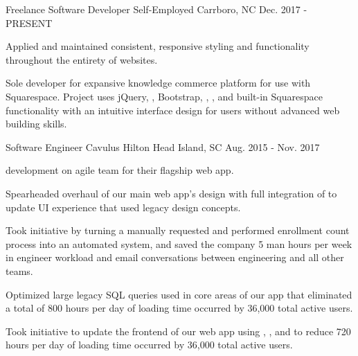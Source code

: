 

\begin{cventries}

  \cventry
    {Freelance Software Developer} %
    {Self-Employed} %
    {Carrboro, NC} %
    {Dec. 2017 - PRESENT} %
    {
      \begin{cvitems} %
        \item {Applied and maintained consistent, responsive  styling and functionality throughout the entirety of  websites.}
        \item {Sole developer for expansive knowledge commerce platform for use with Squarespace. Project uses jQuery, , Bootstrap, , , and built-in Squarespace functionality with an intuitive interface design for users without advanced web building skills.}
      \end{cvitems}
    }

  \cventry
    {Software Engineer} %
    {Cavulus} %
    {Hilton Head Island, SC} %
    {Aug. 2015 - Nov. 2017} %
    {
      \begin{cvitems} %
        \item { development on agile team for their flagship web app.}
        \item {Spearheaded overhaul of our main web app's design with full integration of  to update UI experience that used legacy design concepts.}
        \item {Took initiative by turning a manually requested and performed enrollment count process into an automated system, and saved the company 5 man hours per week in engineer workload and email conversations between engineering and all other teams.}
        \item {Optimized large legacy SQL queries used in core areas of our app that eliminated a total of 800 hours per day of loading time occurred by 36,000 total active users.}
        \item {Took initiative to update the frontend of our web app using , , and  to reduce 720 hours per day of loading time occurred by 36,000 total active users.}
      \end{cvitems}
    }


\end{cventries}
